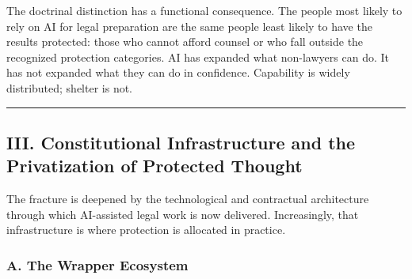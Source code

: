 \documentclass[
  12pt,
]{article}
\begin{document}
The doctrinal distinction has a functional consequence. The people most
likely to rely on AI for legal preparation are the same people least
likely to have the results protected: those who cannot afford counsel or
who fall outside the recognized protection categories. AI has expanded
what non-lawyers can do. It has not expanded what they can do in
confidence. Capability is widely distributed; shelter is not.

\begin{center}\rule{0.5\linewidth}{0.5pt}\end{center}

\subsection{III. Constitutional Infrastructure and the Privatization of
Protected
Thought}\label{iii-constitutional-infrastructure-and-the-privatization-of-protected-thought}

The fracture is deepened by the technological and contractual
architecture through which AI-assisted legal work is now delivered.
Increasingly, that infrastructure is where protection is allocated in
practice.

\subsubsection{A. The Wrapper Ecosystem}\label{a-the-wrapper-ecosystem}
\end{document}
